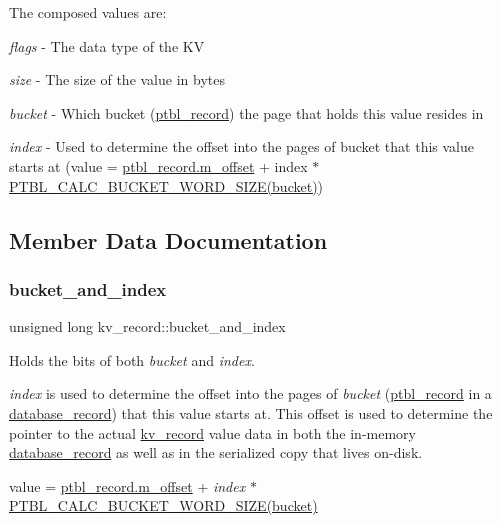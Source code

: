 The composed values are\+:
\begin{DoxyItemize}
\item {\itshape flags} -\/ The data type of the KV
\item {\itshape size} -\/ The size of the value in bytes
\item {\itshape bucket} -\/ Which bucket (\mbox{\hyperlink{structptbl__record}{ptbl\+\_\+record}}) the page that holds this value resides in
\item {\itshape index} -\/ Used to determine the offset into the pages of bucket that this value starts at (value = \mbox{\hyperlink{structptbl__record_acec45fcdf4427d3a1b62c84973d5f484}{ptbl\+\_\+record.\+m\+\_\+offset}} + index $\ast$ \mbox{\hyperlink{records_8h_ab49380468cb45feb3cc044c7337b5e7c}{P\+T\+B\+L\+\_\+\+C\+A\+L\+C\+\_\+\+B\+U\+C\+K\+E\+T\+\_\+\+W\+O\+R\+D\+\_\+\+S\+I\+Z\+E(bucket)}}) 
\end{DoxyItemize}

\subsection{Member Data Documentation}
\mbox{\label{structkv__record_aa6e3c994316398afea8be6a05094f5b0}} 
\subsubsection{\texorpdfstring{bucket\+\_\+and\+\_\+index}{bucket\_and\_index}}
{\footnotesize\ttfamily unsigned long kv\+\_\+record\+::bucket\+\_\+and\+\_\+index}



Holds the bits of both {\itshape bucket} and {\itshape index}. 

{\itshape index} is used to determine the offset into the pages of {\itshape bucket} (\mbox{\hyperlink{structptbl__record}{ptbl\+\_\+record}} in a \mbox{\hyperlink{structdatabase__record}{database\+\_\+record}}) that this value starts at. This offset is used to determine the pointer to the actual \mbox{\hyperlink{structkv__record}{kv\+\_\+record}} value data in both the in-\/memory \mbox{\hyperlink{structdatabase__record}{database\+\_\+record}} as well as in the serialized copy that lives on-\/disk.

value = \mbox{\hyperlink{structptbl__record_acec45fcdf4427d3a1b62c84973d5f484}{ptbl\+\_\+record.\+m\+\_\+offset}} + {\itshape index} $\ast$ \mbox{\hyperlink{records_8h_ab49380468cb45feb3cc044c7337b5e7c}{P\+T\+B\+L\+\_\+\+C\+A\+L\+C\+\_\+\+B\+U\+C\+K\+E\+T\+\_\+\+W\+O\+R\+D\+\_\+\+S\+I\+Z\+E(bucket)}}

